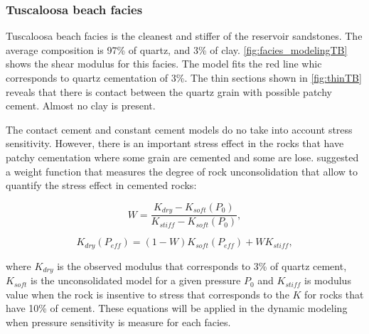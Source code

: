 \subsubsection{Tuscaloosa beach facies}

Tuscaloosa beach facies is the cleanest and stiffer of the reservoir
sandstones. The average composition is 97\% of quartz, and 3\% of clay.
\ref{fig:facies_modelingTB} shows the shear modulus for this facies. The model fits the
red line whic corresponds to quartz cementation of 3\%. The thin sections shown in \ref{fig:thinTB} reveals that there is contact between the quartz grain with possible patchy cement. Almost no clay
is present.

The contact cement and constant cement models do no take into account 
stress sensitivity. However, there is an important stress effect 
in the rocks that have patchy cementation where some grain are cemented and some are lose. 
\citep{ref:avsethcement} suggested a weight function that measures the degree of rock 
unconsolidation that allow to quantify the stress effect in cemented rocks:
 
\begin{equation}
W=\frac{K_{dry}-K_{soft}(P_{0})}{K_{stiff}-K_{soft}(P_{0})},
  \label{eq:mc}
\end{equation}

\begin{equation}
K_{dry}(P_{eff})=(1-W)K_{soft}(P_{eff})+WK_{stiff},
  \label{eq:mc}
\end{equation}

where $K_{dry}$ is the observed modulus that corresponds to 3\% of quartz cement, $K_{soft}$ is
the unconsolidated model for a given pressure $P_{0}$ and $K_{stiff}$ is modulus value when
the rock is insentive to stress that corresponds to the $K$ for rocks that have 10\% of cement. These equations
will be applied in the dynamic modeling when pressure sensitivity is measure for each facies.






